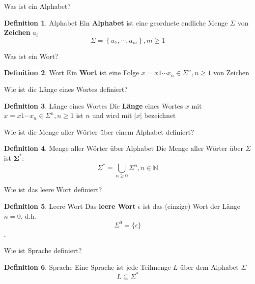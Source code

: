 \documentclass[12pt]{article}
\theoremstyle{definition}
\newtheorem*{definition}{Definition}
\theoremstyle{remark}
\begin{document}
 
Was ist ein Alphabet?

\theoremstyle{definition}
\begin{definition}{Alphabet}
Ein \textbf{Alphabet} ist eine geordnete endliche Menge $\Sigma$ von \textbf{Zeichen} $a_i$
$$ \Sigma=\left \{a_1,\cdots,a_m\right \}, m \geq 1 $$
\end{definition}

Was ist ein Wort?

\theoremstyle{definition}
\begin{definition}{Wort}
Ein \textbf{Wort} ist eine Folge $x = x1\cdots x_n \in \Sigma^n, n \geq 1$ von Zeichen
\end{definition}

Wie ist die Länge eines Wortes definiert?

\theoremstyle{definition}
\begin{definition}{Länge eines Wortes}
Die \textbf{Länge} eines Wortes $x$ mit $x = x1\cdots x_n \in \Sigma^n, n \geq 1$ ist $n$ und wird mit $|x|$ bezeichnet
\end{definition}

Wie ist die Menge aller Wörter über einem Alphabet definiert?

\begin{definition}{Menge aller Wörter über Alphabet}
Die Menge aller Wörter über $\Sigma$ ist $\mathbf{\Sigma^*}$:
$$\Sigma^* = \bigcup_{n \geq 0} \Sigma^n, n \in \mathbb{N} $$
\end{definition}

Wie ist das leere Wort definiert?

\begin{definition}{Leere Wort}
Das \textbf{leere Wort} $\epsilon$ ist das (einzige) Wort der Länge $n = 0$, d.h. $$\Sigma^0 = \{ \epsilon\}$$.
\end{definition}

Wie ist Sprache definiert?

\begin{definition}{Sprache}
Eine Sprache ist jede Teilmenge $L$ über dem Alphabet $\Sigma$
$$ L \subseteq \Sigma^* $$
\end{definition}
\end{document}
